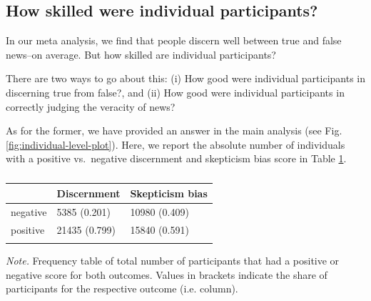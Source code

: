 \documentclass[
  doc,floatsintext]{apa6}
\begin{document}
\subsection{How skilled were individual participants?}\label{how-skilled-were-individual-participants}

In our meta analysis, we find that people discern well between true and false news--on average. But how skilled are individual participants?

There are two ways to go about this: (i) How good were individual participants in discerning true from false?, and (ii) How good were individual participants in correctly judging the veracity of news?

As for the former, we have provided an answer in the main analysis (see Fig. \ref{fig:individual-level-plot}). Here, we report the absolute number of individuals with a positive vs.~negative discernment and skepticism bias score in Table \ref{tab:individuals-direction}.

\begin{table}[tbp]

\begin{center}
\begin{threeparttable}

\caption{\label{tab:individuals-direction}}

\begin{tabular}{lll}
\toprule
 & \multicolumn{1}{c}{Discernment} & \multicolumn{1}{c}{Skepticism  bias}\\
\midrule
negative & 5385 (0.201) & 10980 (0.409)\\
positive & 21435 (0.799) & 15840 (0.591)\\
\bottomrule
\addlinespace
\end{tabular}

\begin{tablenotes}[para]
\normalsize{\textit{Note.} Frequency table of total number of participants that had a positive or negative score for both outcomes. Values in brackets indicate the share of participants for the respective outcome (i.e. column).}
\end{tablenotes}

\end{threeparttable}
\end{center}

\end{table}
\end{document}
